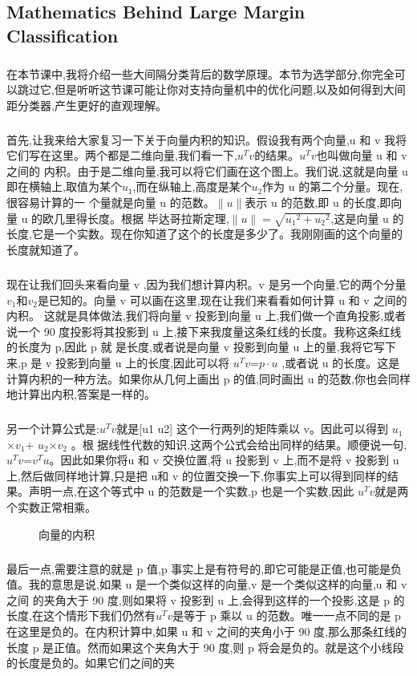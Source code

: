 \documentclass{article}
\begin{document}
\begin{CJK}{UTF8}{gbsn}
\subsection{Mathematics Behind Large Margin Classification}
\subparagraph{}
在本节课中,我将介绍一些大间隔分类背后的数学原理。本节为选学部分,你完全可以跳过它,但是听听这节课可能让你对支持向量机中的优化问题,以及如何得到大间距分类器,产生更好的直观理解。
\subparagraph{}
首先,让我来给大家复习一下关于向量内积的知识。假设我有两个向量,u 和 v 我将它们写在这里。两个都是二维向量,我们看一下,$u^Tv$的结果。$u^Tv$也叫做向量 u 和 v 之间的
内积。由于是二维向量,我可以将它们画在这个图上。我们说,这就是向量 u 即在横轴上,取值为某个$u_1$,而在纵轴上,高度是某个$u_2$作为 u 的第二个分量。现在,很容易计算的一
个量就是向量 u 的范数。$\parallel{u}\parallel$表示 u 的范数,即 u 的长度,即向量 u 的欧几里得长度。根据
毕达哥拉斯定理,$\parallel{u}\parallel=\sqrt{{u_1}^2+{u_2}^2}$,这是向量 u 的长度,它是一个实数。现在你知道了这个的长度是多少了。我刚刚画的这个向量的长度就知道了。
\subparagraph{}
现在让我们回头来看向量 v ,因为我们想计算内积。v 是另一个向量,它的两个分量$v_1$和$v_2$是已知的。向量 v 可以画在这里,现在让我们来看看如何计算 u 和 v 之间的内积。
这就是具体做法,我们将向量 v 投影到向量 u 上,我们做一个直角投影,或者说一个 90 度投影将其投影到 u 上,接下来我度量这条红线的长度。我称这条红线的长度为 p,因此 p 就
是长度,或者说是向量 v 投影到向量 u 上的量,我将它写下来,p 是 v 投影到向量 u 上的长度,因此可以将 $u^Tv$=$p \cdot{u}$ ,或者说 u 的长度。这是计算内积的一种方法。如果你从几何上画出 p 的值,同时画出 u 的范数,你也会同样地计算出内积,答案是一样的。
\subparagraph{}
另一个计算公式是:$u^Tv$就是[u1 u2] 这个一行两列的矩阵乘以 v。因此可以得到 $u_1$×$v_1$+ $u_2$×$v_2$ 。根
据线性代数的知识,这两个公式会给出同样的结果。顺便说一句,$u^Tv$=$v^Tu$。因此如果你将u 和 v 交换位置,将 u 投影到 v 上,而不是将 v 投影到 u 上,然后做同样地计算,只是把 u和 v 的位置交换一下,你事实上可以得到同样的结果。声明一点,在这个等式中 u 的范数是一个实数,p 也是一个实数,因此 $u^Tv$就是两个实数正常相乘。
\begin{figure}[H]
\label{fig:717}
\caption{向量的内积}
\end{figure}
\subparagraph{}
最后一点,需要注意的就是 p 值,p 事实上是有符号的,即它可能是正值,也可能是负值。我的意思是说,如果 u 是一个类似这样的向量,v 是一个类似这样的向量,u 和 v 之间
的夹角大于 90 度,则如果将 v 投影到 u 上,会得到这样的一个投影,这是 p 的长度,在这个情形下我们仍然有$u^Tv$是等于 p 乘以 u 的范数。唯一一点不同的是 p 在这里是负的。在内积计算中,如果 u 和 v 之间的夹角小于 90 度,那么那条红线的长度 p 是正值。然而如果这个夹角大于 90 度,则 p 将会是负的。就是这个小线段的长度是负的。如果它们之间的夹

\end{CJK}
\end{document}
